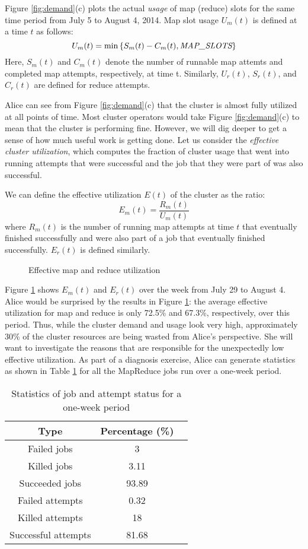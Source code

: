 Figure \ref{fig:demand}(c) plots the actual {\em usage} of
map (reduce) slots for the same time period from July 5 to August 
4, 2014. Map slot usage $U_m(t)$ is defined  at a time $t$ as follows:
\[
U_{m}(t)=\min\left\{S_{m}(t)-C_{m}(t),\mbox{\em MAP\_SLOTS}\right\}
\]
Here, $S_m(t)$ and $C_m(t)$ denote the number of runnable 
map attemts and completed map attempts, respectively, at
time t. Similarly, $U_r(t)$, $S_r(t)$, and $C_r(t)$ are defined for reduce
attempts.

Alice can see from Figure \ref{fig:demand}(c) that the cluster is almost
fully utilized at all points of time. Most cluster operators
would take Figure \ref{fig:demand}(c) to mean that the cluster
is performing fine. However, we will dig deeper to get a sense
of how much useful work is getting done. 
Let us consider the {\em effective cluster utilization}, which 
computes the fraction of cluster usage 
that went into running attempts that were successful and the 
job that they were part of was also successful. 

We can define the effective utilization $E(t)$ of the cluster as the ratio:
\[
E_{m}(t)=\frac{R_{m}(t)}{U_{m}(t)}
\]
where $R_m(t)$ is the number of running map attempts at time $t$
that eventually finished successfully and were also part of a job that 
eventually finished successfully. $E_r(t)$ is defined similarly. 

\begin{figure}
  \centering
  \caption{Effective map and reduce utilization}
  \label{fig:utilization}
\end{figure}

Figure \ref{fig:utilization} shows $E_m(t)$
and $E_r(t)$ over the week from July 29 to August 4. Alice 
would be surprised by the results in Figure \ref{fig:utilization}:
the average effective utilization for map and reduce is only 72.5\% and
67.3\%, respectively, over this period. Thus, while the cluster 
demand and usage look very high, approximately 30\% of the cluster
resources are being wasted from Alice's perspective. She will 
want to investigate the reasons that are responsible for the 
unexpectedly low effective utilization.
As part of a diagnosis exercise, Alice can generate 
statistics as shown in Table \ref{tab:task-statistics} for 
all the MapReduce jobs run over a one-week period. 

\begin{table}
  \centering
  \caption{Statistics of job and attempt status for a one-week period}
  \begin{tabular}{|c|c|l|} \hline
    Type & Percentage (\%)\\ \hline
    Failed jobs & 3\\ \hline
    Killed jobs & 3.11\\ \hline
    Succeeded jobs & 93.89\\ \hline
    Failed attempts & 0.32\\ \hline
    Killed attempts & 18\\ \hline
    Successful attempts & 81.68\\
    \hline\end{tabular}
    \label{tab:task-statistics}
\end{table}

